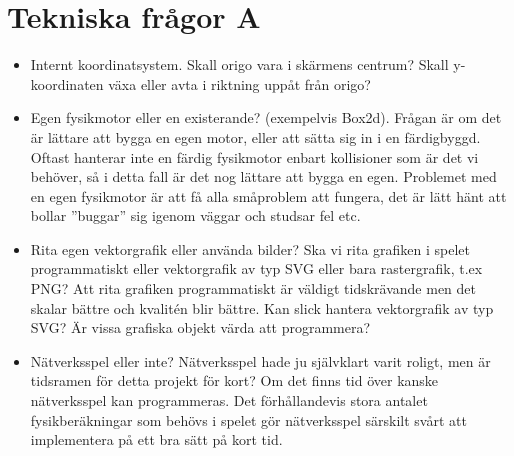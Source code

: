 \documentclass[a4paper,11pt]{article}
\begin{document}
\section{Tekniska frågor A}
\begin{itemize}
\item Internt koordinatsystem. Skall origo vara i skärmens centrum?
Skall y-koordinaten växa eller avta i riktning uppåt från origo?

\item Egen fysikmotor eller en existerande? (exempelvis Box2d). 
\noindent Frågan är om det är lättare att bygga en egen motor,
eller att sätta sig in i en färdigbyggd. Oftast hanterar inte en färdig fysikmotor enbart kollisioner som 
är det vi behöver, så i detta fall är det nog lättare att bygga en egen. Problemet med en egen fysikmotor är
att få alla småproblem att fungera, det är lätt hänt att bollar ''buggar'' sig igenom väggar och studsar fel etc.

\item Rita egen vektorgrafik eller använda bilder?
\noindent Ska vi rita grafiken i spelet programmatiskt eller vektorgrafik av typ SVG eller bara rastergrafik, t.ex PNG? 
Att rita grafiken programmatiskt är väldigt tidskrävande men det skalar bättre och kvalitén blir bättre.
Kan slick hantera vektorgrafik av typ SVG? Är vissa grafiska objekt värda att programmera? 

\item Nätverksspel eller inte?
\noindent Nätverksspel hade ju självklart varit roligt, men är tidsramen för detta projekt för kort?
Om det finns tid över kanske nätverksspel kan programmeras. Det förhållandevis stora antalet
fysikberäkningar som behövs i spelet gör nätverksspel särskilt svårt att implementera
på ett bra sätt på kort tid.
\end{itemize}
\end{document}
